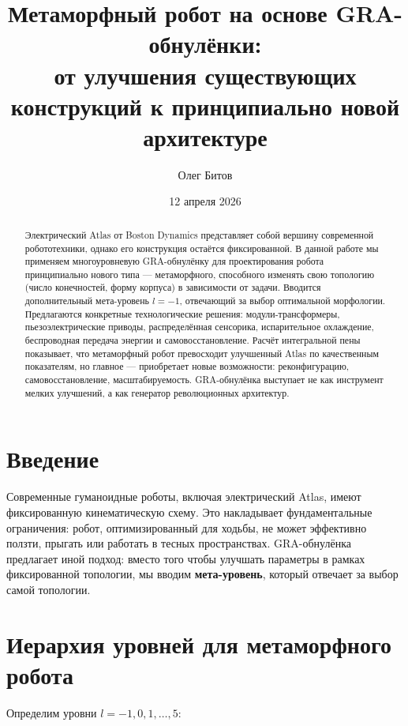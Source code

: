 \documentclass[12pt,a4paper]{article}
\title{Метаморфный робот на основе GRA-обнулёнки:\\ от улучшения существующих конструкций к принципиально новой архитектуре}
\author{Олег Битов}
\date{12 апреля 2026}
\begin{document}
\maketitle

\begin{abstract}
Электрический Atlas от Boston Dynamics представляет собой вершину современной робототехники, однако его конструкция остаётся фиксированной. В данной работе мы применяем многоуровневую GRA-обнулёнку для проектирования робота принципиально нового типа — метаморфного, способного изменять свою топологию (число конечностей, форму корпуса) в зависимости от задачи. Вводится дополнительный мета-уровень \(l=-1\), отвечающий за выбор оптимальной морфологии. Предлагаются конкретные технологические решения: модули-трансформеры, пьезоэлектрические приводы, распределённая сенсорика, испарительное охлаждение, беспроводная передача энергии и самовосстановление. Расчёт интегральной пены показывает, что метаморфный робот превосходит улучшенный Atlas по качественным показателям, но главное — приобретает новые возможности: реконфигурацию, самовосстановление, масштабируемость. GRA-обнулёнка выступает не как инструмент мелких улучшений, а как генератор революционных архитектур.
\end{abstract}

\section{Введение}

Современные гуманоидные роботы, включая электрический Atlas, имеют фиксированную кинематическую схему. Это накладывает фундаментальные ограничения: робот, оптимизированный для ходьбы, не может эффективно ползти, прыгать или работать в тесных пространствах. GRA-обнулёнка предлагает иной подход: вместо того чтобы улучшать параметры в рамках фиксированной топологии, мы вводим \textbf{мета-уровень}, который отвечает за выбор самой топологии.

\section{Иерархия уровней для метаморфного робота}

Определим уровни \(l = -1, 0, 1, \dots, 5\):
\end{document}
